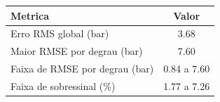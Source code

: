 \begin{tabular}{l c}
    \toprule
    Metrica                        & Valor       \\
    \midrule
    Erro RMS global (bar)          & 3.68        \\
    Maior RMSE por degrau (bar)    & 7.60        \\
    Faixa de RMSE por degrau (bar) & 0.84 a 7.60 \\
    Faixa de sobressinal (\%)      & 1.77 a 7.26 \\
    \bottomrule
\end{tabular}
